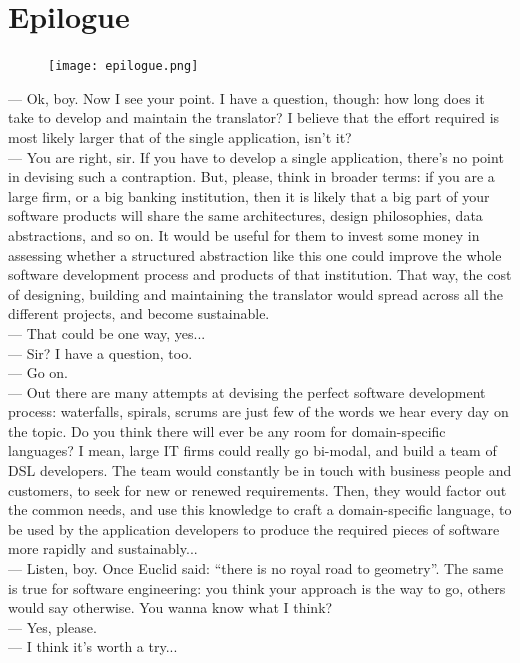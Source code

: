 \documentclass[12pt]{article} %
\newcommand{\dsl}{domain-specific language}
\newcommand{\q}[1]{``#1''}
\begin{document}
\section{Epilogue}
\begin{figure}\texttt{[image: epilogue.png]}\end{figure}
--- Ok, boy. Now I see your point. I have a question, though: how long does it take to develop and maintain the translator? I believe that the effort required is most likely larger that of the single application, isn't it? \\
--- You are right, sir. If you have to develop a single application, there's no point in devising such a contraption. But, please, think in broader terms: if you are a large firm, or a big banking institution, then it is likely that a big part of your software products will share the same architectures, design philosophies, data abstractions, and so on. It would be useful for them to invest some money in assessing whether a structured abstraction like this one could improve the whole software development process and products of that institution. That way, the cost of designing, building and maintaining the translator would spread across all the different projects, and become sustainable. \\
--- That could be one way, yes...\\
--- Sir? I have a question, too.\\
--- Go on.\\
--- Out there are many attempts at devising the perfect software development process: waterfalls, spirals, scrums are just few of the words we hear every day on the topic. Do you think there will ever be any room for \dsl{}s? I mean, large IT firms could really go bi-modal, and build a team of DSL developers. The team would  constantly be in touch with business people and customers, to seek for new or renewed requirements. Then, they would factor out the common needs, and use this knowledge to craft a \dsl{}, to be used by the application developers to produce the required pieces of software more rapidly and sustainably... \\
--- Listen, boy. Once Euclid said: \q{there is no royal road to geometry}. The same is true for software engineering: you think your approach is the way to go, others would say otherwise. You wanna know what I think? \\
--- Yes, please.\\
--- I think it's worth a try...
\newpage
\end{document}
